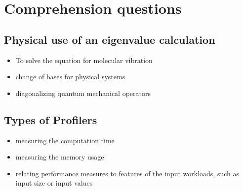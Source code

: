 \setcounter{section}{-1}
\section{Comprehension questions}

\subsection{Physical use of an eigenvalue calculation}
\begin{itemize}
\item To solve the equation for molecular vibration
\item change of bases for physical systems
\item diagonalizing quantum mechanical operators
\end{itemize}
\subsection{Types of Profilers}
\begin{itemize}
\item measuring the computation time
\item measuring the memory usage
\item relating performance measures to features of the input workloads, such as input size or input values
\end{itemize}